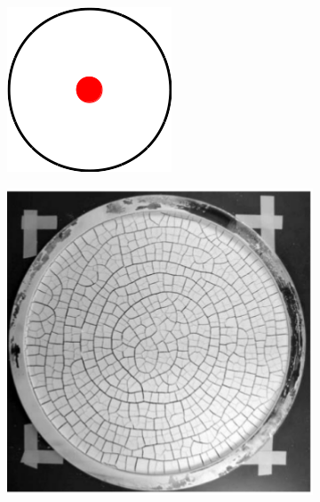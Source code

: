 \begin{figure}[htb!]
    \begin{subfigure}{0.18\textwidth}
        \includegraphics[width=\textwidth]{past/figures/ring_schematic.png}
    \end{subfigure}
    \begin{subfigure}{0.18\textwidth}
        \includegraphics[width=\textwidth]{past/figures/paste_ring.png}

\end{subfigure}
\end{figure}
